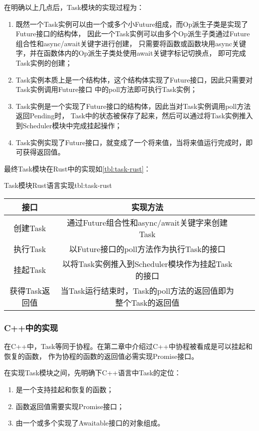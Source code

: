 \documentclass[supercite]{HustGraduPaper}
\newcommand{\rtbl}[1]{\autoref{tbl:#1}}
\theoremstyle{definition}
\begin{document}
在明确以上几点后，Task模块的实现过程为：
\begin{enumerate}[label={(\arabic*)}]
  \item 既然一个Task实例可以由一个或多个小Future组成，而Op派生子类是实现了Future接口的结构体，
    因此一个Task实例可以由多个Op派生子类通过Future组合性和async/await关键字进行创建，
    只需要将函数或函数块用async关键字，并在函数体内的Op派生子类处使用await关键字标记切换点，
    即可完成Task实例的创建；
  \item Task实例本质上是一个结构体，这个结构体实现了Future接口，因此只需要对Task实例调用Future接口
    中的poll方法即可执行Task实例；
  \item Task实例是一个实现了Future接口的结构体，因此当对Task实例调用poll方法返回Pending时，
    Task中的状态被保存了起来，然后可以通过将Task实例推入到Scheduler模块中完成挂起操作；
  \item Task实例实现了Future接口，就变成了一个将来值，当将来值运行完成时，即可获得返回值。
\end{enumerate}

最终Task模块在Rust中的实现如\rtbl{task-rust}：

\begin{generaltab}{Task模块Rust语言实现}{tbl:task-rust}
  \begin{tabular}{c|ccc}
    \toprule
    接口 & 实现方法 \\
    \midrule
    创建Task & 通过Future组合性和async/await关键字来创建Task \\
    执行Task & 以Future接口的poll方法作为执行Task的接口 \\
    挂起Task & 以将Task实例推入到Scheduler模块作为挂起Task的接口 \\
    获得Task返回值 & 当Task运行结束时，Task的poll方法的返回值即为整个Task的返回值 \\
    \bottomrule
  \end{tabular}
\end{generaltab}

\subsubsection{C++中的实现}

在C++中，Task等同于协程。在第二章中介绍过C++中协程被看成是可以挂起和恢复的函数，
作为协程的函数的返回值必需实现Promise接口。\par

在实现Task模块之间，先明确下C++语言中Task的定位：
\begin{enumerate}[label={(\arabic*)}]
  \item 是一个支持挂起和恢复的函数；
  \item 函数返回值需要实现Promise接口；
  \item 由一个或多个实现了Awaitable接口的对象组成。
\end{enumerate}
\end{document}
